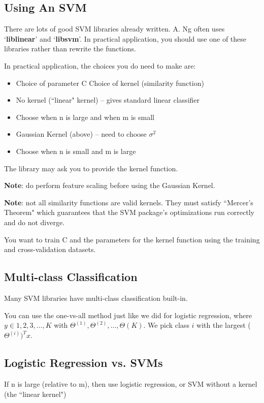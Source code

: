\subsection{Using An SVM}

There are lots of good SVM libraries already written. A. Ng often uses `\textbf{liblinear}' and `\textbf{libsvm}'. In practical application, you should use one of these libraries rather than rewrite the functions.

In practical application, the choices you do need to make are:
\begin{itemize}
\item Choice of parameter C
\teim Choice of kernel (similarity function)
\item No kernel (``linear" kernel) -- gives standard linear classifier
\item Choose when n is large and when m is small
\item Gaussian Kernel (above) -- need to choose $\sigma^2$ 
\item Choose when n is small and m is large
\end{itemize}

The library may ask you to provide the kernel function.

\textbf{Note}: do perform feature scaling before using the Gaussian Kernel.

\textbf{Note}: not all similarity functions are valid kernels. They must satisfy ``Mercer's Theorem" which guarantees that the SVM package's optimizations run correctly and do not diverge.

You want to train C and the parameters for the kernel function using the training and cross-validation datasets.

\subsection{Multi-class Classification}
Many SVM libraries have multi-class classification built-in.

You can use the one-vs-all method just like we did for logistic regression, where $y \in {1,2,3,\dots,K}$ with $\Theta^{(1)}, \Theta^{(2)}, \dots,\Theta{(K)}$. We pick class $i$ with the largest ($\Theta^{(i)})^Tx$.

\subsection{Logistic Regression vs. SVMs}
If n is large (relative to m), then use logistic regression, or SVM without a kernel (the ``linear kernel")

